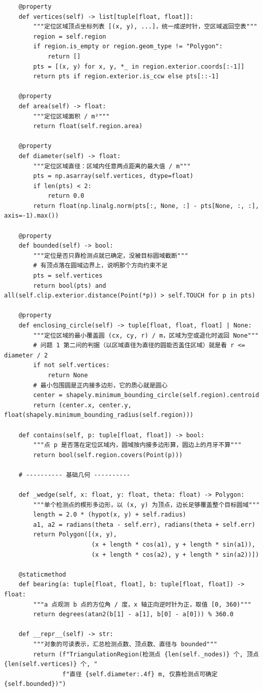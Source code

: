 \documentclass[UTF8, zihao=5,AutoFakeBold=2]{ctexart}
\begin{document}
\begin{lstlisting}
    @property
    def vertices(self) -> list[tuple[float, float]]:
        """定位区域顶点坐标列表 [(x, y), ...]，统一成逆时针，空区域返回空表"""
        region = self.region
        if region.is_empty or region.geom_type != "Polygon":
            return []
        pts = [(x, y) for x, y, *_ in region.exterior.coords[:-1]]
        return pts if region.exterior.is_ccw else pts[::-1]

    @property
    def area(self) -> float:
        """定位区域面积 / m²"""
        return float(self.region.area)

    @property
    def diameter(self) -> float:
        """定位区域直径：区域内任意两点距离的最大值 / m"""
        pts = np.asarray(self.vertices, dtype=float)
        if len(pts) < 2:
            return 0.0
        return float(np.linalg.norm(pts[:, None, :] - pts[None, :, :], axis=-1).max())

    @property
    def bounded(self) -> bool:
        """定位是否只靠检测点就已确定，没被目标圆域截断"""
        # 有顶点落在圆域边界上，说明那个方向约束不足
        pts = self.vertices
        return bool(pts) and all(self.clip.exterior.distance(Point(*p)) > self.TOUCH for p in pts)

    @property
    def enclosing_circle(self) -> tuple[float, float, float] | None:
        """定位区域的最小覆盖圆 (cx, cy, r) / m，区域为空或退化时返回 None"""
        # 问题 1 第二问的判据（以区域直径为直径的圆能否盖住区域）就是看 r <= diameter / 2
        if not self.vertices:
            return None
        # 最小包围圆是正内接多边形，它的质心就是圆心
        center = shapely.minimum_bounding_circle(self.region).centroid
        return (center.x, center.y, float(shapely.minimum_bounding_radius(self.region)))

    def contains(self, p: tuple[float, float]) -> bool:
        """点 p 是否落在定位区域内，圆域按内接多边形算，圆边上的月牙不算"""
        return bool(self.region.covers(Point(p)))

    # ---------- 基础几何 ----------

    def _wedge(self, x: float, y: float, theta: float) -> Polygon:
        """单个检测点的楔形多边形，以 (x, y) 为顶点，边长足够覆盖整个目标圆域"""
        length = 2.0 * (hypot(x, y) + self.radius)
        a1, a2 = radians(theta - self.err), radians(theta + self.err)
        return Polygon([(x, y),
                        (x + length * cos(a1), y + length * sin(a1)),
                        (x + length * cos(a2), y + length * sin(a2))])

    @staticmethod
    def bearing(a: tuple[float, float], b: tuple[float, float]) -> float:
        """a 点观测 b 点的方位角 / 度，x 轴正向逆时针为正，取值 [0, 360)"""
        return degrees(atan2(b[1] - a[1], b[0] - a[0])) % 360.0

    def __repr__(self) -> str:
        """对象的可读表示，汇总检测点数、顶点数、直径与 bounded"""
        return (f"TriangulationRegion(检测点 {len(self._nodes)} 个, 顶点 {len(self.vertices)} 个, "
                f"直径 {self.diameter:.4f} m, 仅靠检测点可确定 {self.bounded})")
	\end{lstlisting}
\end{document}
